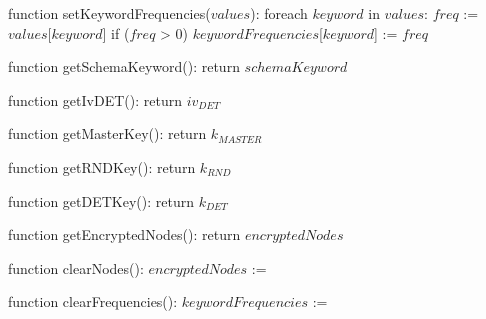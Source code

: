 function setKeywordFrequencies($values$):
    foreach $keyword$ in $values$:
        $freq$ := $values$[$keyword$]
        if ($freq$ > 0)
            $keywordFrequencies$[$keyword$] := $freq$
            
function getSchemaKeyword():
    return $schemaKeyword$

function getIvDET():
    return $iv_{DET}$

function getMasterKey():
    return $k_{MASTER}$

function getRNDKey():
    return $k_{RND}$

function getDETKey():
    return $k_{DET}$

function getEncryptedNodes():
    return $encryptedNodes$

function clearNodes():
    $encryptedNodes$ := {}

function clearFrequencies():
    $keywordFrequencies$ := {}